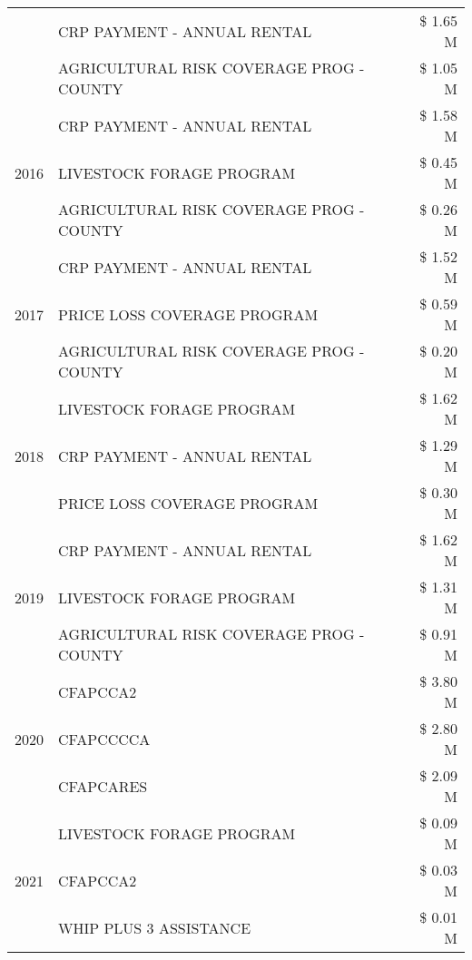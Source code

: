 \begin{tabular}{llr}
 & CRP PAYMENT - ANNUAL RENTAL & \$ 1.65 M \\
 & AGRICULTURAL RISK COVERAGE PROG - COUNTY & \$ 1.05 M \\
\cline{1-3}
\multirow[t]{3}{*}{2016} & CRP PAYMENT - ANNUAL RENTAL & \$ 1.58 M \\
 & LIVESTOCK FORAGE PROGRAM & \$ 0.45 M \\
 & AGRICULTURAL RISK COVERAGE PROG - COUNTY & \$ 0.26 M \\
\cline{1-3}
\multirow[t]{3}{*}{2017} & CRP PAYMENT - ANNUAL RENTAL & \$ 1.52 M \\
 & PRICE LOSS COVERAGE PROGRAM & \$ 0.59 M \\
 & AGRICULTURAL RISK COVERAGE PROG - COUNTY & \$ 0.20 M \\
\cline{1-3}
\multirow[t]{3}{*}{2018} & LIVESTOCK FORAGE PROGRAM & \$ 1.62 M \\
 & CRP PAYMENT - ANNUAL RENTAL & \$ 1.29 M \\
 & PRICE LOSS COVERAGE PROGRAM & \$ 0.30 M \\
\cline{1-3}
\multirow[t]{3}{*}{2019} & CRP PAYMENT - ANNUAL RENTAL & \$ 1.62 M \\
 & LIVESTOCK FORAGE PROGRAM & \$ 1.31 M \\
 & AGRICULTURAL RISK COVERAGE PROG - COUNTY & \$ 0.91 M \\
\cline{1-3}
\multirow[t]{3}{*}{2020} & CFAPCCA2 & \$ 3.80 M \\
 & CFAPCCCCA & \$ 2.80 M \\
 & CFAPCARES & \$ 2.09 M \\
\cline{1-3}
\multirow[t]{3}{*}{2021} & LIVESTOCK FORAGE PROGRAM & \$ 0.09 M \\
 & CFAPCCA2 & \$ 0.03 M \\
 & WHIP PLUS 3 ASSISTANCE & \$ 0.01 M \\
\cline{1-3}
\bottomrule
\end{tabular}
